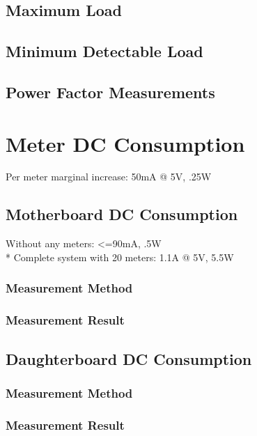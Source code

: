 \documentclass[]{article}
\begin{document}
\subsection{Maximum Load}

\subsection{Minimum Detectable Load}

\subsection{Power Factor Measurements}

\section{Meter DC Consumption}
Per meter marginal increase: 50mA @ 5V, .25W

\subsection{Motherboard DC Consumption}
Without any meters: <=90mA, .5W \\*
Complete system with 20 meters: 1.1A @ 5V, 5.5W


\subsubsection{Measurement Method}
\subsubsection{Measurement Result}

\subsection{Daughterboard DC Consumption}

\subsubsection{Measurement Method}
\subsubsection{Measurement Result}
\end{document}
